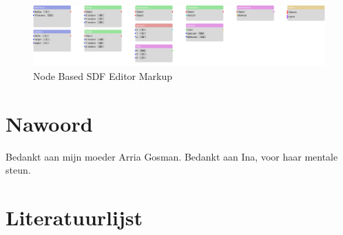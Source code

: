 \documentclass[12pt, a4paper]{article}
\begin{document}
\begin{figure}[H]
	\centering
	\includegraphics[width=\textwidth]{node_editor.png}
	\caption{Node Based SDF Editor Markup}
	\label{fig:node_editor}
\end{figure}
\clearpage
\section{Nawoord}
Bedankt aan mijn moeder Arria Gosman.
Bedankt aan Ina, voor haar mentale steun.
\clearpage
\section{Literatuurlijst}


\clearpage
\end{document}
